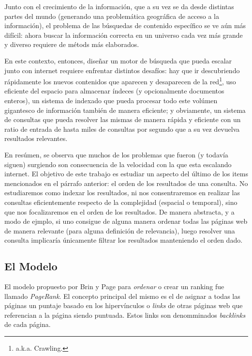 \par Junto con el crecimiento de la informaci\'on, que a su vez se da desde
distintas partes del mundo (generando una problem\'atica geogr\'afica de acceso
a la informaci\'on), el problema de las b\'usquedas de contenido espec\'ifico se
ve a\'un m\'as dif\'icil: ahora buscar la informaci\'on correcta en un universo
cada vez m\'as grande y diverso requiere de m\'etods m\'as elaborados.

\par En este contexto, entonces, dise\~nar un motor de b\'usqueda que pueda
escalar junto con internet requiere enfrentar distintos desaf\'ios: hay que ir
descubriendo r\'apidamente los nuevos contenidos que aparecen y desaparecen de
la red\footnote{a.k.a. Crawling.}, uso eficiente del espacio para almacenar
\'indeces (y opcionalmente documentos enteros), un sistema de indexado que pueda
procesar todo este vol\'umen gigantesco de informaci\'on tambi\'en de manera
eficiente; y obviamente, un sistema de consultas que pueda resolver las mismas
de manera r\'apida y eficiente con un ratio de entrada de hasta miles de
consultas por segundo que a su vez devuelva resultados relevantes.

\par En res\'umen, se observa que muchos de los problemas que fueron (y todav\'ia
siguen) surgiendo son consecuencia de la velocidad con la que esta escalando
internet. El objetivo de este trabajo es estudiar un aspecto del \'ultimo de los
items mencionados en el p\'arrafo anterior: el orden de los resultados de una
consulta. No estudiaremos como indexar los resultados, ni nos consentraremos en
realizar las consultas eficientemente respecto de la complejidad (espacial o
temporal), sino que nos focalizaremos en el orden de los resultados. De manera
abstracta, y a modo de ejmplo, si uno consigue de alguna manera ordenar todas
las p\'aginas web de manera relevante (para alguna definici\'on de relevancia),
luego resolver una consulta implicar\'ia \'unicamente filtrar los resultados
manteniendo el orden dado.


\subsection{El Modelo}
\par El modelo propuesto por Brin y Page para \emph{ordenar} o crear un ranking
fue llamado \emph{PageRank}. El concepto principal del mismo es el de asignar a
todas las p\'aginas un puntaje basado en los hiperv\'inculos o \emph{links} de
otras p\'aginas web que referencian a la p\'agina siendo puntuada. Estos links
son denomminados \emph{backlinks} de cada p\'agina.


